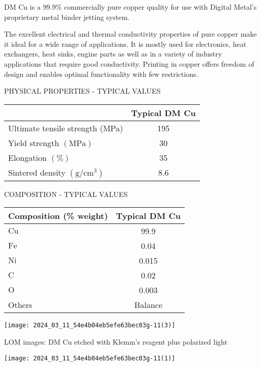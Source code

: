 \documentclass[10pt]{article}
\begin{document}
DM Cu is a $99.9 \%$ commercially pure copper quality for use with Digital Metal's proprietary metal binder jetting system.

The excellent electrical and thermal conductivity properties of pure copper make it ideal for a wide range of applications. It is mostly used for electronics, heat exchangers, heat sinks, engine parts as well as in a variety of industry applications that require good conductivity. Printing in copper offers freedom of design and enables optimal functionality with few restrictions.

PHYSICAL PROPERTIES - TYPICAL VALUES

\begin{center}
\begin{tabular}{|l|c|}
\hline
 & Typical DM Cu \\
\hline
Ultimate tensile strength (MPa) & 195 \\
\hline
Yield strength $(\mathrm{MPa})$ & 30 \\
\hline
Elongation $(\%)$ & 35 \\
\hline
Sintered density $\left(\mathrm{g} / \mathrm{cm}^{3}\right)$ & 8.6 \\
\hline
\end{tabular}
\end{center}

COMPOSITION - TYPICAL VALUES

\begin{center}
\begin{tabular}{|l|c|}
\hline
Composition (\% weight) & Typical DM Cu \\
\hline
$\mathrm{Cu}$ & 99.9 \\
\hline
$\mathrm{Fe}$ & 0.04 \\
\hline
$\mathrm{Ni}$ & 0.015 \\
\hline
$\mathrm{C}$ & 0.02 \\
\hline
$\mathrm{O}$ & 0.003 \\
\hline
Others & Balance \\
\hline
\end{tabular}
\end{center}

\begin{center}
\texttt{[image: 2024\_03\_11\_54e4b04eb5efe63bec03g-11(3)]}
\end{center}

LOM images: DM Cu etched with Klemm's reagent plus polarized light

\begin{center}
\texttt{[image: 2024\_03\_11\_54e4b04eb5efe63bec03g-11(1)]}
\end{center}
\end{document}

